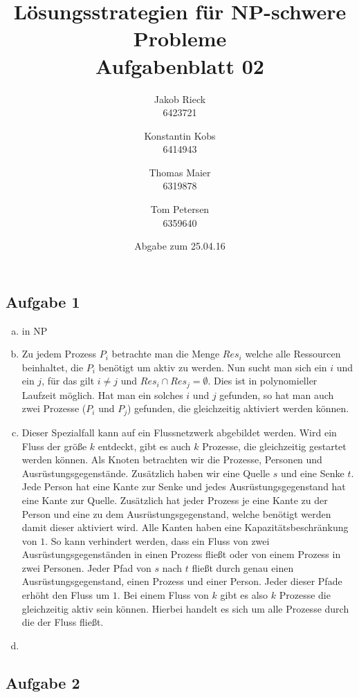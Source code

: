 \documentclass[12pt,a4paper]{article}
\title{Lösungsstrategien für NP-schwere Probleme\\Aufgabenblatt 02}
\author{
		Jakob Rieck\\
		\small{6423721}
	\and
		Konstantin Kobs\\
		\small{6414943}
	\and
		Thomas Maier\\
		\small{6319878}
	\and
		Tom Petersen\\
		\small{6359640}
}
\date{Abgabe zum 25.04.16}
\begin{document}
\maketitle

\subsection*{Aufgabe 1}

 \begin{enumerate}[a)]
 	\item in NP
 	\item Zu jedem Prozess $P_i$ betrachte man die Menge $Res_i$ welche alle Ressourcen beinhaltet, die $P_i$ benötigt um aktiv zu werden. Nun sucht man sich ein $i$ und ein $j$, für das gilt $i \neq j$ und $Res_i \cap Res_j =\emptyset$. Dies ist in polynomieller Laufzeit möglich. Hat man ein solches $i$ und $j$ gefunden, so hat man auch zwei Prozesse ($P_i$ und $P_j$) gefunden, die gleichzeitig aktiviert werden können. 
 	
 	\item Dieser Spezialfall kann auf ein Flussnetzwerk abgebildet werden. Wird ein Fluss der größe $k$ entdeckt, gibt es auch $k$ Prozesse, die gleichzeitig gestartet werden können. Als Knoten betrachten wir die Prozesse, Personen und Ausrüstungsgegenstände. Zusätzlich haben wir eine Quelle $s$ und eine Senke $t$. Jede Person hat eine Kante zur Senke und jedes Ausrüstungsgegenstand hat eine Kante zur Quelle. Zusätzlich hat jeder Prozess je eine Kante zu der Person und eine zu dem Ausrüstungsgegenstand, welche benötigt werden damit dieser aktiviert wird. Alle Kanten haben eine Kapazitätsbeschränkung von $1$. So kann verhindert werden, dass ein Fluss von zwei Ausrüstungsgegenständen in einen Prozess fließt oder von einem Prozess in zwei Personen. Jeder Pfad von $s$ nach $t$ fließt durch genau einen Ausrüstungsgegenstand, einen Prozess und einer Person. Jeder dieser Pfade erhöht den Fluss um $1$. Bei einem Fluss von $k$ gibt es also $k$ Prozesse die gleichzeitig aktiv sein können. Hierbei handelt es sich um alle Prozesse durch die der Fluss fließt.  
 	\item %
\end{enumerate}
\subsection*{Aufgabe 2}
\end{document}
